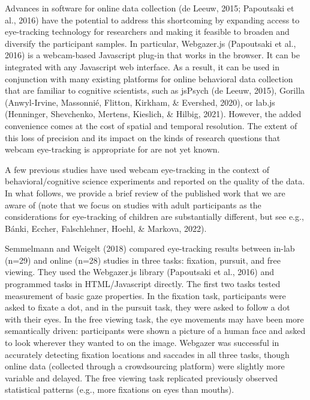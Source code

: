 \documentclass[
  man,floatsintext]{apa6}
\begin{document}
Advances in software for online data collection (de Leeuw, 2015; Papoutsaki et al., 2016) have the potential to address this shortcoming by expanding access to eye-tracking technology for researchers and making it feasible to broaden and diversify the participant samples. In particular, Webgazer.js (Papoutsaki et al., 2016) is a webcam-based Javascript plug-in that works in the browser. It can be integrated with any Javascript web interface. As a result, it can be used in conjunction with many existing platforms for online behavioral data collection that are familiar to cognitive scientists, such as jsPsych (de Leeuw, 2015), Gorilla (Anwyl-Irvine, Massonnié, Flitton, Kirkham, \& Evershed, 2020), or lab.js (Henninger, Shevchenko, Mertens, Kieslich, \& Hilbig, 2021). However, the added convenience comes at the cost of spatial and temporal resolution. The extent of this loss of precision and its impact on the kinds of research questions that webcam eye-tracking is appropriate for are not yet known.

A few previous studies have used webcam eye-tracking in the context of behavioral/cognitive science experiments and reported on the quality of the data. In what follows, we provide a brief review of the published work that we are aware of (note that we focus on studies with adult participants as the considerations for eye-tracking of children are substantially different, but see e.g., Bánki, Eccher, Falschlehner, Hoehl, \& Markova, 2022).

Semmelmann and Weigelt (2018) compared eye-tracking results between in-lab (n=29) and online (n=28) studies in three tasks: fixation, pursuit, and free viewing. They used the Webgazer.js library (Papoutsaki et al., 2016) and programmed tasks in HTML/Javascript directly. The first two tasks tested measurement of basic gaze properties. In the fixation task, participants were asked to fixate a dot, and in the pursuit task, they were asked to follow a dot with their eyes. In the free viewing task, the eye movements may have been more semantically driven: participants were shown a picture of a human face and asked to look wherever they wanted to on the image. Webgazer was successful in accurately detecting fixation locations and saccades in all three tasks, though online data (collected through a crowdsourcing platform) were slightly more variable and delayed. The free viewing task replicated previously observed statistical patterns (e.g., more fixations on eyes than mouths).
\end{document}
